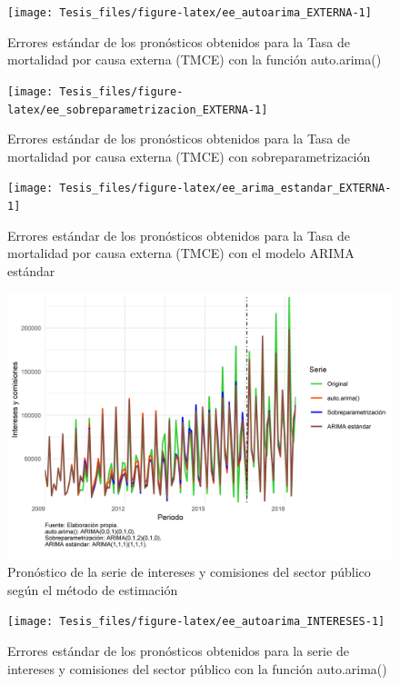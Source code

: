 \documentclass[
]{article}
\begin{document}
\begin{figure}[H]
\texttt{[image: Tesis\_files/figure-latex/ee\_autoarima\_EXTERNA-1]} \caption{Errores estándar de los pronósticos obtenidos para la Tasa de mortalidad por causa externa (TMCE) con la función auto.arima()}\label{fig:ee_autoarima_EXTERNA}
\end{figure}

\begin{figure}[H]
\texttt{[image: Tesis\_files/figure-latex/ee\_sobreparametrizacion\_EXTERNA-1]} \caption{Errores estándar de los pronósticos obtenidos para la Tasa de mortalidad por causa externa (TMCE) con sobreparametrización}\label{fig:ee_sobreparametrizacion_EXTERNA}
\end{figure}

\begin{figure}[H]
\texttt{[image: Tesis\_files/figure-latex/ee\_arima\_estandar\_EXTERNA-1]} \caption{Errores estándar de los pronósticos obtenidos para la Tasa de mortalidad por causa externa (TMCE) con el modelo ARIMA estándar}\label{fig:ee_arima_estandar_EXTERNA}
\end{figure}

\begin{figure}[H]
\includegraphics[width=1\linewidth,height=1\textheight]{Tesis_files/figure-latex/pronostico_INTERESES-1} \caption{Pronóstico de la serie de intereses y comisiones del sector público según el método de estimación}\label{fig:pronostico_INTERESES}
\end{figure}

\begin{figure}[H]
\texttt{[image: Tesis\_files/figure-latex/ee\_autoarima\_INTERESES-1]} \caption{Errores estándar de los pronósticos obtenidos para la serie de intereses y comisiones del sector público con la función auto.arima()}\label{fig:ee_autoarima_INTERESES}
\end{figure}
\end{document}
